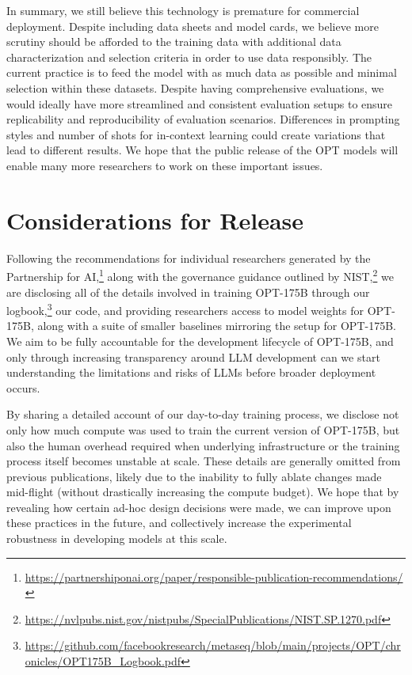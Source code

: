 \documentclass[11pt]{article}
\newcommand{\OPT}[0]{{OPT-175B}}
\begin{document}
In summary, we still believe this technology is premature for commercial deployment. Despite including data sheets and model cards, we believe more scrutiny should be afforded to the training data with additional data characterization and selection criteria in order to use data responsibly. The current practice is to feed the model with as much data as possible and minimal selection within these datasets. Despite having comprehensive evaluations, we would ideally have more streamlined and consistent evaluation setups to ensure replicability and reproducibility of evaluation scenarios. Differences in prompting styles and number of shots for in-context learning could create variations that lead to different results. We hope that the public release of the OPT models will enable many more researchers to work on these important issues.

\section{Considerations for Release}
\label{sec:release}
Following the recommendations for individual researchers generated by the Partnership for AI,\footnote{\url{https://partnershiponai.org/paper/responsible-publication-recommendations/}} along with the governance guidance outlined by NIST,\footnote{\url{https://nvlpubs.nist.gov/nistpubs/SpecialPublications/NIST.SP.1270.pdf}} we are disclosing all of the details involved in training OPT-175B through our logbook,\footnote{\url{https://github.com/facebookresearch/metaseq/blob/main/projects/OPT/chronicles/OPT175B_Logbook.pdf}} our code, and providing researchers access to model weights for \OPT{}, along with a suite of smaller baselines mirroring the setup for \OPT{}.  We aim to be fully accountable for the development lifecycle of \OPT{}, and only through increasing transparency around LLM development can we start understanding the limitations and risks of LLMs before broader deployment occurs.

By sharing a detailed account of our day-to-day training process, we disclose not only how much compute was used to train the current version of OPT-175B, but also the human overhead required when underlying infrastructure or the training process itself becomes unstable at scale.  These details are generally omitted from previous publications, likely due to the inability to fully ablate changes made mid-flight (without drastically increasing the compute budget).  We hope that by revealing how certain ad-hoc design decisions were made, we can improve upon these practices in the future, and collectively increase the experimental robustness in developing models at this scale.
\end{document}
